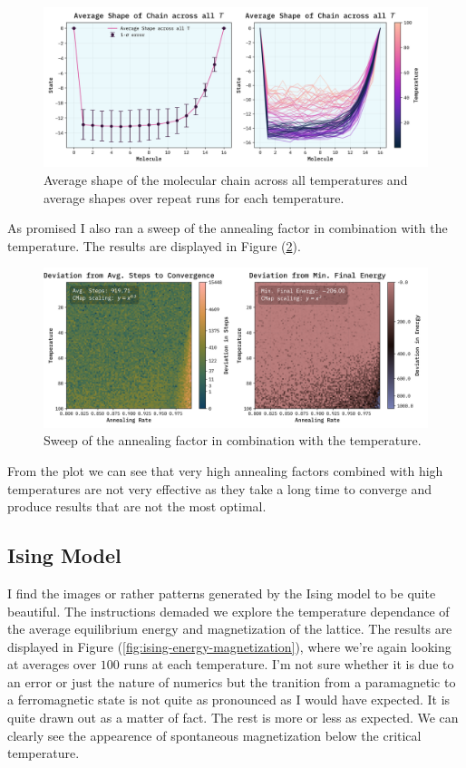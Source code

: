 \documentclass[10pt, titlepage, a4paper]{article}
\begin{document}
\begin{figure}[H]
    \centering
    \includegraphics[width=.95\textwidth]{../MolecularChain2/Images/rand-init-T-spread.png}
    \caption{Average shape of the molecular chain across all temperatures and average shapes over repeat runs for each temperature.}
    \label{fig:molecular-chain-shapes}
\end{figure}

As promised I also ran a sweep of the annealing factor in combination with the temperature. The results are displayed in Figure 
(\ref{fig:annealing-sweep}).

\begin{figure}[H]
    \centering
    \includegraphics[width=.95\textwidth]{../MolecularChain2/Images/T-aR-gridscan.png}
    \caption{Sweep of the annealing factor in combination with the temperature.}
    \label{fig:annealing-sweep}
\end{figure}

From the plot we can see that very high annealing factors combined with high temperatures are not very effective as they take a long time to
converge and produce results that are not the most optimal.

\subsection{Ising Model}
I find the images or rather patterns generated by the Ising model to be quite beautiful. The instructions demaded we explore the temperature
dependance of the average equilibrium energy and magnetization of the lattice. The results are displayed in Figure (\ref{fig:ising-energy-magnetization}), where 
we're again looking at averages over $100$ runs at each temperature. I'm not sure whether it is due to an error or just the nature of 
numerics but the tranition from a paramagnetic to a ferromagnetic state is not quite as pronounced as I would have expected. It is 
quite drawn out as a matter of fact. The rest is more or less as expected. We can clearly see the appearence of spontaneous 
magnetization below the critical temperature.
\end{document}
